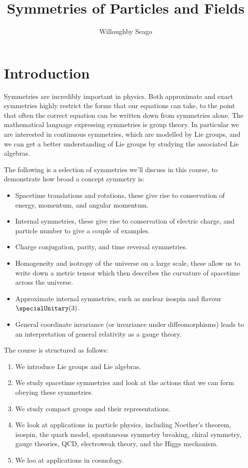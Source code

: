 \documentclass[fleqn]{NotesClass}
\title{Symmetries of Particles and Fields}
\author{Willoughby Seago}
\date{}
\begin{document}
    \frontmatter
    \titlepage
    \innertitlepage{}
    \tableofcontents
    \listoffigures
    \mainmatter
    
    \chapter{Introduction}
    Symmetries are incredibly important in physics.
    Both approximate and exact symmetries highly restrict the forms that our equations can take, to the point that often the correct equation can be written down from symmetries alone.
    The mathematical language expressing symmetries is group theory.
    In particular we are interested in continuous symmetries, which are modelled by Lie groups, and we can get a better understanding of Lie groups by studying the associated Lie algebras.
    
    The following is a selection of symmetries we'll discuss in this course, to demonstrate how broad a concept symmetry is:
    \begin{itemize}
        \item Spacetime translations and rotations, these give rise to conservation of energy, momentum, and angular momentum.
        \item Internal symmetries, these give rise to conservation of electric charge, and particle number to give a couple of examples.
        \item Charge conjugation, parity, and time reversal symmetries.
        \item Homogeneity and isotropy of the universe on a large scale, these allow us to write down a metric tensor which then describes the curvature of spacetime across the universe.
        \item Approximate internal symmetries, such as nuclear isospin and flavour \(\specialUnitary(3)\).
        \item General coordinate invariance (or invariance under diffeomorphisms) leads to an interpretation of general relativity as a gauge theory.
    \end{itemize}
    
    The course is structured as follows:
    \begin{enumerate}
        \item We introduce Lie groups and Lie algebras.
        \item We study spacetime symmetries and look at the actions that we can form obeying these symmetries.
        \item We study compact groups and their representations.
        \item We look at applications in particle physics, including Noether's theorem, isospin, the quark model, spontaneous symmetry breaking, chiral symmetry, gauge theories, QCD, electroweak theory, and the Higgs mechanism.
        \item We loo at applications in cosmology.
    \end{enumerate}
    
\end{document}
